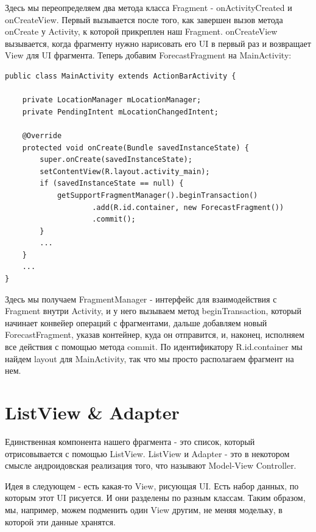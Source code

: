 \documentclass[12 pt]{article}
\begin{document}
Здесь мы переопределяем два метода класса Fragment - onActivityCreated и onCreateView. Первый вызывается после того, как завершен вызов метода onCreate у Activity, к которой прикреплен наш Fragment.\newline
onCreateView вызывается, когда фрагменту нужно нарисовать его UI в первый раз и возвращает View для UI фрагмента.\newline
Теперь добавим ForecastFragment на MainActivity:
	\begin{lstlisting}
public class MainActivity extends ActionBarActivity {

    private LocationManager mLocationManager;
    private PendingIntent mLocationChangedIntent;

    @Override
    protected void onCreate(Bundle savedInstanceState) {
        super.onCreate(savedInstanceState);
        setContentView(R.layout.activity_main);
        if (savedInstanceState == null) {
            getSupportFragmentManager().beginTransaction()
                    .add(R.id.container, new ForecastFragment())
                    .commit();
        }
        ...
    }
    ...
}
    \end{lstlisting}
Здесь мы получаем FragmentManager - интерфейс для взаимодействия с Fragment внутри Activity, и у него вызываем метод beginTransaction, который начинает конвейер операций с фрагментами, дальше добавляем новый ForecastFragment, указав контейнер, куда он отправится, и, наконец, исполняем все действия с помощью метода commit. По идентификатору R.id.container мы найдем layout для MainActivity, так что мы просто располагаем фрагмент на нем.

\section{ListView \& Adapter}   
    Единственная компонента нашего фрагмента - это список, который отрисовывается с помощью ListView. \newline
    ListView и Adapter - это в некотором смысле андроидовская реализация того, что называют Model-View Controller.
    
    Идея в следующем - есть какая-то View, рисующая UI. Есть набор данных, по которым этот UI рисуется. И они разделены по разным классам. Таким образом, мы, например, можем подменить один View другим, не меняя модельку, в которой эти данные хранятся.
\end{document}
